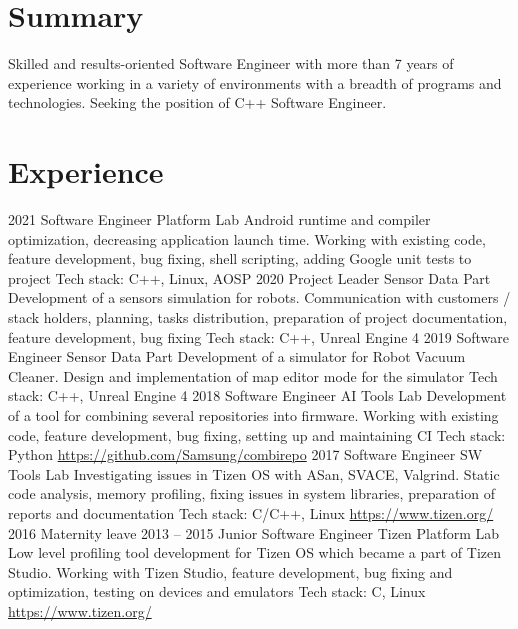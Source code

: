 \documentclass[11pt,a4paper]{moderncv}
\begin{document}
\maketitle

\section{Summary}
\cvitem {} {Skilled and results-oriented Software Engineer with more than 7 years of experience working in a variety of environments with a breadth of programs and technologies. Seeking the position of C++ Software Engineer.}
\section{Experience}
\cventry
  {2021}
  {Software Engineer}
  {Platform Lab}
  {\newline Android runtime and compiler optimization, decreasing application launch time. Working with existing code, feature development, bug fixing, shell scripting, adding Google unit tests to project}
  {\newline Tech stack: C++, Linux, AOSP}
  {}
\cventry
  {2020}
  {Project Leader}
  {Sensor Data Part}
  {\newline Development of a sensors simulation for robots. Communication with customers / stack holders, planning, tasks distribution, preparation of project documentation, feature development, bug fixing}
  {\newline Tech stack: C++, Unreal Engine 4}
  {}
\cventry
  {2019}
  {Software Engineer}
  {Sensor Data Part}
  {\newline Development of a simulator for Robot Vacuum Cleaner. Design and implementation of map editor mode for the simulator}
  {\newline Tech stack: C++, Unreal Engine 4}
  {}
\cventry
  {2018}
  {Software Engineer}
  {AI Tools Lab}
  {\newline Development of a tool for combining several repositories into firmware. Working with existing code, feature development, bug fixing, setting up and maintaining CI}
  {\newline Tech stack: Python}
  {\url{https://github.com/Samsung/combirepo}}
\cventry
  {2017}
  {Software Engineer}
  {SW Tools Lab}
  {\newline Investigating issues in Tizen OS with ASan, SVACE, Valgrind. Static code analysis, memory profiling, fixing issues in system libraries, preparation of reports and documentation}
  {\newline Tech stack: C/C++, Linux}
  {\url{https://www.tizen.org/}}
\cventry
  {2016}
  {Maternity leave}
  {}
  {}
  {}
  {}
\cventry
  {2013 -- 2015}
  {Junior Software Engineer}
  {Tizen Platform Lab}
  {\newline Low level profiling tool development for Tizen OS which became a part of Tizen Studio. Working with Tizen Studio, feature development, bug fixing and optimization, testing on devices and emulators}
  {\newline Tech stack: C, Linux}
  {\url{https://www.tizen.org/}}
\end{document}
